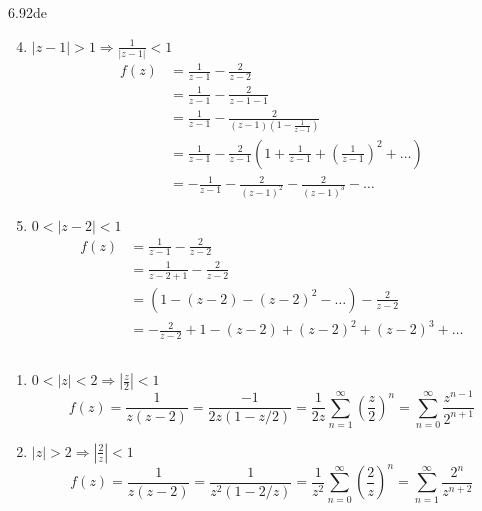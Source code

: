 \documentclass{article}
\theoremstyle{definition}
\begin{document}
    \newpage

    \begin{prob}{6.92de} $ $
    	\begin{enumerate}[label=\alph*.)]
    		\setcounter{enumi}{3}
    		\item $|z-1|>1 \Rightarrow \frac{1}{|z-1|} < 1 $
    			\begin{align*}
    				f(z) &= \frac{1}{z-1} - \frac{2}{z-2} \\
    					 &= \frac{1}{z-1} - \frac{2}{z-1-1} \\
    					 &= \frac{1}{z-1} - \frac{2}{(z-1)\left( 1 - \frac{1}{z-1} \right)} \\
    					 &= \frac{1}{z-1} - \frac{2}{z-1} \left( 1 + \frac{1}{z-1} + \left( \frac{1}{z-1} \right)^2 + \dots \right) \\
    					 &= -\frac{1}{z-1} - \frac{2}{(z-1)^2} - \frac{2}{(z-1)^3} - \dots
    			\end{align*}
    		\item $0<|z-2|<1$
    			\begin{align*}
    				f(z) &= \frac{1}{z-1} - \frac{2}{z-2} \\ 
    					 &= \frac{1}{z-2+1} - \frac{2}{z-2} \\
    					 &= \left( 1 - (z-2) - (z-2)^2 - \dots \right) - \frac{2}{z-2}\\
    					 &= -\frac{2}{z-2} + 1 - (z-2) + (z-2)^2 + (z-2)^3 + \dots
    			\end{align*}
    	\end{enumerate}
    \end{prob}

    \begin{prob}{6.93} $ $
    	\begin{enumerate}[label=\alph*.)]
    		\item $0<|z|<2 \Rightarrow \left| \frac{z}{2} \right| < 1$
    			\[
    				f(z) = \frac{1}{z(z-2)} = \frac{-1}{2z\left( 1 - z/2 \right)} = \frac{1}{2z} \sum\limits_{n=1}^{\infty} \left(\frac{z}{2}\right)^n = \sum\limits_{n=0}^{\infty} \frac{z^{n-1}}{2^{n+1}}
    			\]
    		\item $|z|>2 \Rightarrow \left| \frac{2}{z} \right|<1$
    			\[
    				f(z) = \frac{1}{z(z-2)} = \frac{1}{z^2\left( 1 - 2/z \right)} = \frac{1}{z^2} \sum\limits_{n=0}^{\infty} \left( \frac{2}{z} \right)^n = \sum\limits_{n=1}^{\infty} \frac{2^n}{z^{n+2}}
    			\]
    	\end{enumerate}
    \end{prob}
\end{document}
